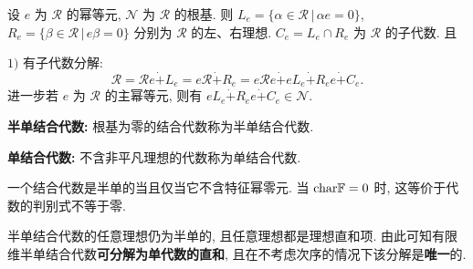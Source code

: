         \begin{theorem}[Pierce 分解]
            设 $e$ 为 $\mathcal{R}$ 的幂等元, $\mathcal{N}$ 为 $\mathcal{R}$ 的根基. 则 $L_e=\{\alpha\in\mathcal{R}\,\big|\,\alpha e = 0\}$, 
            $R_e=\{\beta\in\mathcal{R}\,\big|\,e\beta = 0\}$ 分别为 $\mathcal{R}$ 的左、右理想. 
            $C_e = L_e\cap R_e$ 为 $\mathcal{R}$ 的子代数. 且

            $1)$ 有子代数分解:
            \begin{equation*}
                \mathcal{R} = \mathcal{R}e\dot{+}L_e = e\mathcal{R}\dot{+}R_e = e\mathcal{R}e \dot{+} eL_e \dot{+} R_ee \dot{+} C_e.
            \end{equation*}
            进一步若 $e$ 为 $\mathcal{R}$ 的主幂等元, 则有 $eL_e \dot{+} R_ee \dot{+} C_e\in\mathcal{N}$.


        \end{theorem}

        \begin{definition}
            {\bf 半单结合代数:} 根基为零的结合代数称为半单结合代数.

            {\bf 单结合代数:} 不含非平凡理想的代数称为单结合代数.
        \end{definition}
        \begin{remark}
            一个结合代数是半单的当且仅当它不含特征幂零元. 当 ${\rm char}\mathbb{F} = 0$ 时, 这等价于代数的判别式不等于零.
        \end{remark}
        \begin{theorem}
            半单结合代数的任意理想仍为半单的, 且任意理想都是理想直和项. 由此可知有限维半单结合代数{\bf 可分解为单代数的直和}, 且在不考虑次序的情况下该分解是{\bf 唯一}的.
        \end{theorem}
        
